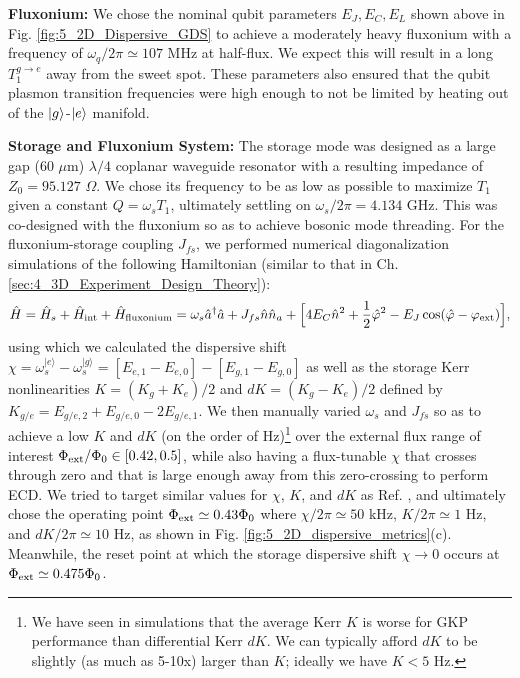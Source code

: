 \noindent \textbf{Fluxonium:} We chose the nominal qubit parameters $E_J, E_C, E_L$ shown above in Fig. \ref{fig:5_2D_Dispersive_GDS} to achieve a moderately heavy fluxonium with a frequency of $\omega_q/2\pi \simeq 107$ MHz at half-flux. We expect this will result in a long $T_1^{g\to e}$ away from the sweet spot. These parameters also ensured that the qubit plasmon transition frequencies were high enough to not be limited by heating out of the $\lvert g\rangle$-$\lvert e\rangle$ manifold. 


\noindent \textbf{Storage and Fluxonium System:} The storage mode was designed as a large gap (60 $\mu$m) $\lambda/4$ coplanar waveguide resonator with a resulting impedance of $Z_0 = 95.127$ $\Omega$. We chose its frequency to be as low as possible to maximize $T_1$ given a constant $Q = \omega_s T_1$, ultimately settling on $\omega_s/2\pi = 4.134$ GHz. This was co-designed with the fluxonium so as to achieve bosonic mode threading. For the fluxonium-storage coupling $J_{fs}$, we performed numerical diagonalization simulations of the following Hamiltonian (similar to that in Ch. \ref{sec:4_3D_Experiment_Design_Theory}):
\begin{equation}
    \hat{H} =  \hat{H}_s + \hat{H}_{\rm int} + \hat{H}_{\rm fluxonium} =  \omega_s \hat{a}^\dagger \hat{a} + J_{fs} \hat{n}\hat{n}_a + \Big[4E_C \hat{n}^2 + \frac{1}{2}\hat{\varphi}^2 - E_J\cos(\hat{\varphi}-\varphi_{\rm ext})\Big],
\end{equation}
using which we calculated the dispersive shift $\chi = \omega_s^{|e\rangle} - \omega_s^{|g\rangle} = [E_{e,1} - E_{e, 0}] - [E_{g, 1} - E_{g, 0}]$ as well as the storage Kerr nonlinearities $K = (K_g + K_e)/2$ and $dK = (K_g - K_e)/2$ defined by $K_{g/e} = E_{g/e, 2} + E_{g/e, 0} - 2E_{g/e, 1}$. We then manually varied $\omega_s$ and $J_{fs}$ so as to achieve a low $K$ and $dK$ (on the order of Hz)\footnote{We have seen in simulations that the average Kerr $K$ is worse for GKP performance than differential Kerr $dK$. We can typically afford $dK$ to be slightly (as much as 5-10x) larger than $K$; ideally we have $K < 5$ Hz.} over the external flux range of interest $\Phi_{\rm ext}/\Phi_0 \in [0.42, 0.5]$, while also having a flux-tunable $\chi$ that crosses through zero and that is large enough away from this zero-crossing to perform ECD. We tried to target similar values for $\chi$, $K$, and $dK$ as Ref. \cite{sivak2023gkp-expt}, and ultimately chose the operating point $\Phi_{\rm ext} \simeq 0.43\Phi_0$ where $\chi/2\pi \simeq 50$ kHz, $K/2\pi \simeq 1$ Hz, and $dK/2\pi \simeq 10$ Hz, as shown in Fig. \ref{fig:5_2D_dispersive_metrics}(c). Meanwhile, the reset point at which the storage dispersive shift $\chi \to 0$ occurs at $\Phi_{\rm ext} \simeq 0.475\Phi_0$. 
